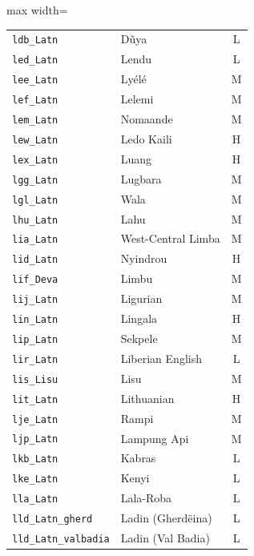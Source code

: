 {\begin{adjustbox}{max width=\textwidth}
\begin{tabular}{llc}
        \texttt{ldb\_Latn} & D\~uya & L \\
        \texttt{led\_Latn} & Lendu & L \\
        \texttt{lee\_Latn} & Lyélé & M \\
        \texttt{lef\_Latn} & Lelemi & M \\
        \texttt{lem\_Latn} & Nomaande & M \\
        \texttt{lew\_Latn} & Ledo Kaili & H \\
        \texttt{lex\_Latn} & Luang & H \\
        \texttt{lgg\_Latn} & Lugbara & M \\
        \texttt{lgl\_Latn} & Wala & M \\
        \texttt{lhu\_Latn} & Lahu & M \\
        \texttt{lia\_Latn} & West-Central Limba & M \\
        \texttt{lid\_Latn} & Nyindrou & H \\
        \texttt{lif\_Deva} & Limbu & M \\
        \texttt{lij\_Latn} & Ligurian & M \\
        \texttt{lin\_Latn} & Lingala & H \\
        \texttt{lip\_Latn} & Sekpele & M \\
        \texttt{lir\_Latn} & Liberian English & L \\
        \texttt{lis\_Lisu} & Lisu & M \\
        \texttt{lit\_Latn} & Lithuanian & H \\
        \texttt{lje\_Latn} & Rampi & M \\
        \texttt{ljp\_Latn} & Lampung Api & M \\
        \texttt{lkb\_Latn} & Kabras & L \\
        \texttt{lke\_Latn} & Kenyi & L \\
        \texttt{lla\_Latn} & Lala-Roba & L \\
        \texttt{lld\_Latn\_gherd} & Ladin (Gherdëina) & L \\
        \texttt{lld\_Latn\_valbadia} & Ladin (Val Badia) & L \\
        \bottomrule
    \end{tabular}
    \end{adjustbox}
}

